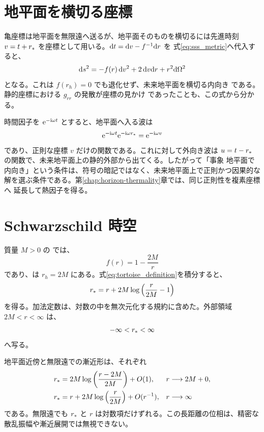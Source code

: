 \section{地平面を横切る座標}

亀座標は地平面を無限遠へ送るが、地平面そのものを横切るには先進時刻
$v=t+r_*$ を座標として用いる。$\mathrm{d} t=\mathrm{d} v-f^{-1}\mathrm{d} r$ を
式\eqref{eq:sss_metric}へ代入すると、
\begin{equation}
\mathrm{d} s^2
=
-f(r)\,\mathrm{d} v^2
+2\,\mathrm{d} v\mathrm{d} r
+r^2\mathrm{d}\Omega^2
\label{eq:ingoing-ef-metric}
\end{equation}
となる。これは $f(r_h)=0$ でも退化せず、未来地平面を横切る内向き
である。静的座標における $g_{rr}$ の発散が座標の見かけ
であったことも、この式から分かる。

時間因子を $\mathrm{e}^{-\mathrm{i}\omega t}$ とすると、地平面へ入る波は
\begin{equation}
\mathrm{e}^{-\mathrm{i}\omega t}\mathrm{e}^{-\mathrm{i}\omega r_*}
=
\mathrm{e}^{-\mathrm{i}\omega v}
\label{eq:ingoing-ef-regular-mode}
\end{equation}
であり、正則な座標 $v$ だけの関数である。これに対して外向き波は
$u=t-r_*$ の関数で、未来地平面上の静的外部から出てくる。したがって「事象
地平面で内向き」という条件は、符号の暗記ではなく、未来地平面上で正則かつ因果的な
解を選ぶ条件である。第\ref{chap:horizon-thermality}章では、同じ正則性を複素座標へ
延長して熱因子を得る。

\section{Schwarzschild 時空}

質量 $M>0$ の では、
\begin{equation}
f(r)
=
1-\frac{2M}{r}
\label{eq:schwarzschild_f}
\end{equation}
であり、は $r_h=2M$ にある。式\eqref{eq:tortoise_definition}を積分すると、
\begin{equation}
r_*
=
r
+2M\log\left(\frac{r}{2M}-1\right)
\label{eq:schwarzschild_tortoise}
\end{equation}
を得る。加法定数は、対数の中を無次元化する規約に含めた。外部領域 $2M<r<\infty$
は、
\begin{equation}
-\infty<r_*<\infty
\end{equation}
へ写る。

地平面近傍と無限遠での漸近形は、それぞれ
\begin{align}
r_*
&=
2M\log\left(\frac{r-2M}{2M}\right)
+O(1),
&& r\longrightarrow 2M+0,
\label{eq:schwarzschild_tortoise_hor}
\\
r_*
&=
r+2M\log\left(\frac{r}{2M}\right)
+O(r^{-1}),
&& r\longrightarrow\infty
\label{eq:schwarzschild_tortoise_inf}
\end{align}
である。無限遠でも $r_*$ と $r$ は対数項だけずれる。この長距離の位相は、精密な
散乱振幅や漸近展開では無視できない。

